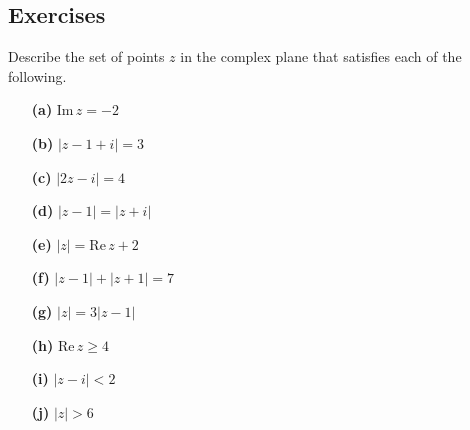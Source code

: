 \subsection{Exercises}


\begin{exercise}
    Describe the set of points \( z \) in the complex plane that satisfies each of the following.
    \begin{enumerate}
        \item[\textbf{(a)}] \( \text{Im} \, z = -2 \)
        \item[\textbf{(b)}] \( |z - 1 + i| = 3 \)
        \item[\textbf{(c)}] \( |2z - i| = 4 \)
        \item[\textbf{(d)}] \( |z - 1| = |z + i| \)
        \item[\textbf{(e)}] \( |z| = \text{Re} \, z + 2 \)
        \item[\textbf{(f)}] \( |z - 1| + |z + 1| = 7 \)
        \item[\textbf{(g)}] \( |z| = 3|z - 1| \)
        \item[\textbf{(h)}] \( \text{Re} \, z \geq 4 \)
        \item[\textbf{(i)}] \( |z - i| < 2 \)
        \item[\textbf{(j)}] \( |z| > 6 \)
      \end{enumerate}
\end{exercise}
